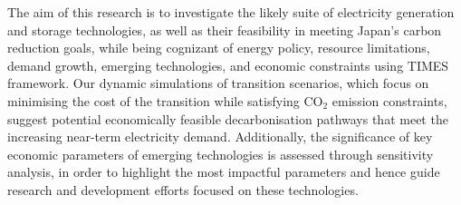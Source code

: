 The aim of this research is to investigate the likely suite of electricity generation and storage technologies, as well as their feasibility in meeting Japan's carbon reduction goals, while being cognizant of energy policy, resource limitations, demand growth, emerging technologies, and economic constraints using \gls{TIMES} framework. Our dynamic simulations of transition scenarios, which focus on minimising the cost of the transition while satisfying CO$_2$ emission constraints, suggest potential economically feasible decarbonisation pathways that meet the increasing near-term electricity demand. Additionally, the significance of key economic parameters of emerging technologies is assessed through sensitivity analysis, in order to highlight the most impactful parameters and hence guide research and development efforts focused on these technologies.
